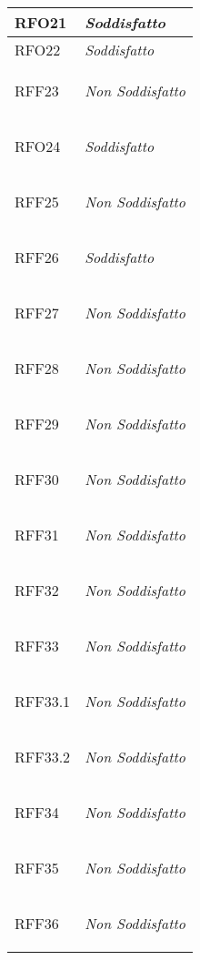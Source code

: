\begin{longtable}{|>{\centering}m{5cm}|m{5cm}<{\centering}|}
    \hypertarget{RFO21}{RFO21} & \textit{Soddisfatto}\\ \hline
   
    \hypertarget{RFO22}{RFO22} & \textit{Soddisfatto}\\ \hline
   
    \hypertarget{RFF23}{RFF23} & \textit{Non Soddisfatto}\\ \hline 
   
    \hypertarget{RFO24}{RFO24} & \textit{Soddisfatto}\\ \hline
   
    \hypertarget{RFF25}{RFF25} & \textit{Non Soddisfatto}\\ \hline
   
    \hypertarget{RFF26}{RFF26} & \textit{Soddisfatto}\\ \hline
   
    \hypertarget{RFF27}{RFF27} & \textit{Non Soddisfatto}\\ \hline
   
    \hypertarget{RFF28}{RFF28} & \textit{Non Soddisfatto}\\ \hline
   
    \hypertarget{RFF29}{RFF29} & \textit{Non Soddisfatto}\\ \hline
   
    \hypertarget{RFF30}{RFF30} & \textit{Non Soddisfatto}\\ \hline
   
    \hypertarget{RFF31}{RFF31} & \textit{Non Soddisfatto}\\ \hline
   
    \hypertarget{RFF32}{RFF32} & \textit{Non Soddisfatto}\\ \hline
   
    \hypertarget{RFF33}{RFF33} & \textit{Non Soddisfatto}\\ \hline
   
    \hypertarget{RFF33.1}{RFF33.1} & \textit{Non Soddisfatto}\\ \hline
   
    \hypertarget{RFF33.2}{RFF33.2} & \textit{Non Soddisfatto}\\ \hline
   
    \hypertarget{RFF34}{RFF34} & \textit{Non Soddisfatto}\\ \hline
   
    \hypertarget{RFF35}{RFF35} & \textit{Non Soddisfatto}\\ \hline
   
    \hypertarget{RFF36}{RFF36} & \textit{Non Soddisfatto}\\ \hline
   

\end{longtable}

